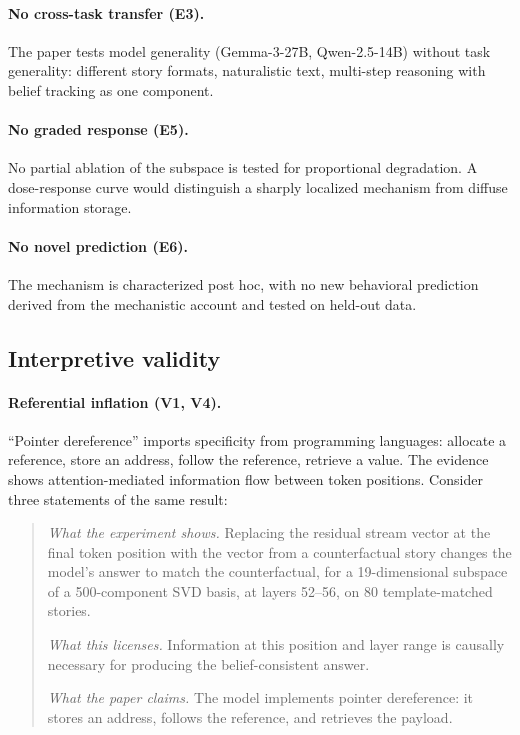 \documentclass{article}
\begin{document}
\paragraph{No cross-task transfer (E3).}
The paper tests model generality (Gemma-3-27B, Qwen-2.5-14B) without task generality: different story formats, naturalistic text, multi-step reasoning with belief tracking as one component.

\paragraph{No graded response (E5).}
No partial ablation of the subspace is tested for proportional degradation. A dose-response curve would distinguish a sharply localized mechanism from diffuse information storage.

\paragraph{No novel prediction (E6).}
The mechanism is characterized post hoc, with no new behavioral prediction derived from the mechanistic account and tested on held-out data.

\subsection{Interpretive validity}

\paragraph{Referential inflation (V1, V4).}
``Pointer dereference'' imports specificity from programming languages: allocate a reference, store an address, follow the reference, retrieve a value. The evidence shows attention-mediated information flow between token positions. Consider three statements of the same result:

\begin{quote}
\emph{What the experiment shows.} Replacing the residual stream vector at the final token position with the vector from a counterfactual story changes the model's answer to match the counterfactual, for a 19-dimensional subspace of a 500-component SVD basis, at layers 52--56, on 80 template-matched stories.

\emph{What this licenses.} Information at this position and layer range is causally necessary for producing the belief-consistent answer.

\emph{What the paper claims.} The model implements pointer dereference: it stores an address, follows the reference, and retrieves the payload.
\end{quote}
\end{document}
